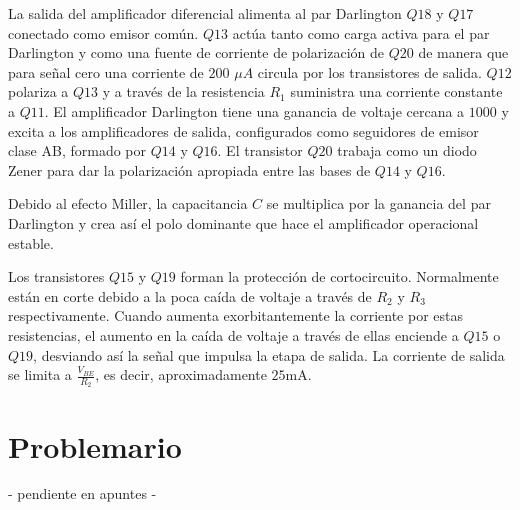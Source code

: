La salida del amplificador diferencial alimenta al par Darlington \(Q18\) y \(Q17\) conectado como emisor común. \(Q13\) actúa tanto como carga activa para el par Darlington y como una fuente de corriente de polarización de \(Q20\) de manera que para señal cero una corriente de \(200\) \(\mu A\) circula por los transistores de salida.	\(Q12\) polariza a \(Q13\) y a través de la resistencia \(R_1\) suministra una corriente constante a \(Q11\). El amplificador Darlington tiene una ganancia de voltaje cercana a \(1000\) y excita a los amplificadores de salida, configurados como seguidores de emisor clase AB, formado por \(Q14\) y \(Q16\). El transistor \(Q20\) trabaja como un diodo Zener para dar la polarización apropiada entre las bases de \(Q14\) y \(Q16\).

Debido al efecto Miller, la capacitancia \(C\) se multiplica por la ganancia del par Darlington y crea así el polo dominante que hace el amplificador operacional estable.

Los transistores \(Q15\) y \(Q19\) forman la protección de cortocircuito. Normalmente están en corte debido a la poca caída de voltaje a través de \(R_2\) y \(R_3\) respectivamente. Cuando aumenta exorbitantemente la corriente por estas resistencias, el aumento en la caída de voltaje a través de ellas enciende a \(Q15\) o \(Q19\), desviando así la señal que impulsa la etapa de salida. La corriente de salida se limita a \( \frac{V_{BE}}{R_2} \), es decir, aproximadamente \( 25 \text{mA} \).

\section{Problemario} %
- pendiente en apuntes -